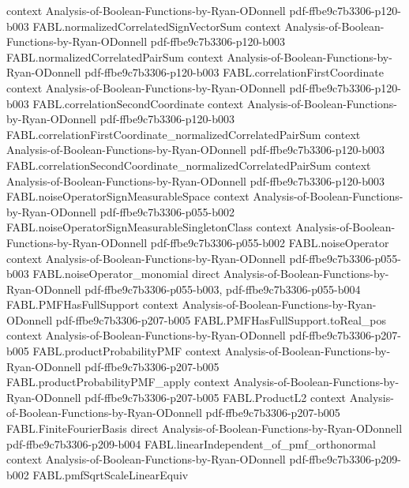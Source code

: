 \begin{theorem}
  {context}
  {Analysis-of-Boolean-Functions-by-Ryan-ODonnell}
  {pdf-ffbe9c7b3306-p120-b003}
\proofstep
  {FABL.normalizedCorrelatedSignVectorSum}
  {context}
  {Analysis-of-Boolean-Functions-by-Ryan-ODonnell}
  {pdf-ffbe9c7b3306-p120-b003}
\proofstep
  {FABL.normalizedCorrelatedPairSum}
  {context}
  {Analysis-of-Boolean-Functions-by-Ryan-ODonnell}
  {pdf-ffbe9c7b3306-p120-b003}
\proofstep
  {FABL.correlationFirstCoordinate}
  {context}
  {Analysis-of-Boolean-Functions-by-Ryan-ODonnell}
  {pdf-ffbe9c7b3306-p120-b003}
\proofstep
  {FABL.correlationSecondCoordinate}
  {context}
  {Analysis-of-Boolean-Functions-by-Ryan-ODonnell}
  {pdf-ffbe9c7b3306-p120-b003}
\proofstep
  {FABL.correlationFirstCoordinate_normalizedCorrelatedPairSum}
  {context}
  {Analysis-of-Boolean-Functions-by-Ryan-ODonnell}
  {pdf-ffbe9c7b3306-p120-b003}
\proofstep
  {FABL.correlationSecondCoordinate_normalizedCorrelatedPairSum}
  {context}
  {Analysis-of-Boolean-Functions-by-Ryan-ODonnell}
  {pdf-ffbe9c7b3306-p120-b003}
\proofstep
  {FABL.noiseOperatorSignMeasurableSpace}
  {context}
  {Analysis-of-Boolean-Functions-by-Ryan-ODonnell}
  {pdf-ffbe9c7b3306-p055-b002}
\proofstep
  {FABL.noiseOperatorSignMeasurableSingletonClass}
  {context}
  {Analysis-of-Boolean-Functions-by-Ryan-ODonnell}
  {pdf-ffbe9c7b3306-p055-b002}
\proofstep
  {FABL.noiseOperator}
  {context}
  {Analysis-of-Boolean-Functions-by-Ryan-ODonnell}
  {pdf-ffbe9c7b3306-p055-b003}
\proofstep
  {FABL.noiseOperator_monomial}
  {direct}
  {Analysis-of-Boolean-Functions-by-Ryan-ODonnell}
  {pdf-ffbe9c7b3306-p055-b003,
    pdf-ffbe9c7b3306-p055-b004}
\proofstep
  {FABL.PMFHasFullSupport}
  {context}
  {Analysis-of-Boolean-Functions-by-Ryan-ODonnell}
  {pdf-ffbe9c7b3306-p207-b005}
\proofstep
  {FABL.PMFHasFullSupport.toReal_pos}
  {context}
  {Analysis-of-Boolean-Functions-by-Ryan-ODonnell}
  {pdf-ffbe9c7b3306-p207-b005}
\proofstep
  {FABL.productProbabilityPMF}
  {context}
  {Analysis-of-Boolean-Functions-by-Ryan-ODonnell}
  {pdf-ffbe9c7b3306-p207-b005}
\proofstep
  {FABL.productProbabilityPMF_apply}
  {context}
  {Analysis-of-Boolean-Functions-by-Ryan-ODonnell}
  {pdf-ffbe9c7b3306-p207-b005}
\proofstep
  {FABL.ProductL2}
  {context}
  {Analysis-of-Boolean-Functions-by-Ryan-ODonnell}
  {pdf-ffbe9c7b3306-p207-b005}
\proofstep
  {FABL.FiniteFourierBasis}
  {direct}
  {Analysis-of-Boolean-Functions-by-Ryan-ODonnell}
  {pdf-ffbe9c7b3306-p209-b004}
\proofstep
  {FABL.linearIndependent_of_pmf_orthonormal}
  {context}
  {Analysis-of-Boolean-Functions-by-Ryan-ODonnell}
  {pdf-ffbe9c7b3306-p209-b002}
\proofstep
  {FABL.pmfSqrtScaleLinearEquiv}

\end{theorem}
